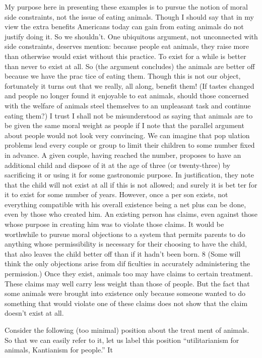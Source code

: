 \documentclass[11pt,openany]{book}
\begin{document}
My purpose here in presenting these examples is to pursue the notion of moral side constraints, not the issue of eating animals. Though I should say that in my view the extra benefits Americans today can gain from eating animals do not justify doing it. So we shouldn't. One ubiquitous argument, not unconnected with side constraints, deserves mention: because people eat animals, they raise more than otherwise would exist without this practice. To exist for a while is better than never to exist at all. So (the argument concludes) the animals are better off because we have the prac tice of eating them. Though this is not our object, fortunately it turns out that we really, all along, benefit them! (If tastes changed and people no longer found it enjoyable to eat animals, should those concerned with the welfare of animals steel themselves to an unpleasant task and continue eating them?) I trust I shall not be misunderstood as saying that animals are to be given the same moral weight as people if I note that the parallel argument about people would not look very convincing. We can imagine that pop ulation problems lead every couple or group to limit their children to some number fixed in advance. A given couple, having reached the number, proposes to have an additional child and dispose of it at the age of three (or twenty-three) by sacrificing it or using it for some gastronomic purpose. In justification, they note that the child will not exist at all if this is not allowed; and surely it is bet ter for it to exist for some number of years. However, once a per son exists, not everything compatible with his overall existence being a net plus can be done, even by those who created him. An existing person has claims, even against those whose purpose in creating him was to violate those claims. It would be worthwhile to pursue moral objections to a system that permits parents to do anything whose permissibility is necessary for their choosing to have the child, that also leaves the child better off than if it hadn't been born. 8 (Some will think the only objections arise from dif ficulties in accurately administering the permission.) Once they exist, animals too may have claims to certain treatment. These claims may well carry less weight than those of people. But the fact that some animals were brought into existence only because someone wanted to do something that would violate one of these claims does not show that the claim doesn't exist at all. 

Consider the following (too minimal) position about the treat ment of animals. So that we can easily refer to it, let us label this position ``utilitarianism for animals, Kantianism for people.'' It 
\end{document}
